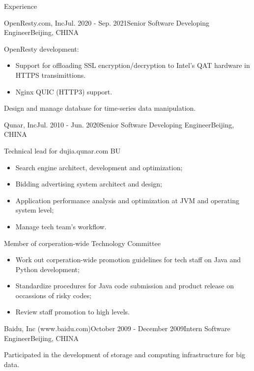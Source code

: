 \documentclass{resume} %
\begin{document}
\begin{rSection}{Experience}

  \begin{rSubsection}{OpenResty.com, Inc}{Jul. 2020 - Sep. 2021}{Senior Software Developing Engineer}{Beijing, CHINA}
  \item OpenResty development:
    \begin {itemize}
    \item Support for offloading SSL encryption/decryption to Intel's QAT hardware in HTTPS transimittions.
    \item Nginx QUIC (HTTP3) support.
    \end{itemize}
  \item Design and manage database for time-series data manipulation.
  \end{rSubsection}
  
  \begin{rSubsection}{Qunar, Inc}{Jul. 2010 - Jun. 2020}{Senior Software Developing Engineer}{Beijing, CHINA}
  \item Technical lead for dujia.qunar.com BU
    \begin{itemize}
    \item Search engine architect, development and optimization;
    \item Bidding advertising system architect and design;
    \item Application performance analysis and optimization at JVM and operating system level;
    \item Manage tech team's workflow.
    \end{itemize}
  \item Member of corperation-wide Technology Committee
    \begin{itemize}
    \item Work out corperation-wide promotion guidelines for tech staff on Java and Python development;
    \item Standardize procedures for Java code submission and product release on occassions of risky codes;
    \item Review staff promotion to high levels.
    \end{itemize}
  
  \end{rSubsection}


  \begin{rSubsection}{Baidu, Inc (www.baidu.com)}{October 2009 - December 2009}{Intern Software Engineer}{Beijing, CHINA}
  \item Participated in the development of storage and computing infrastructure for big data.
  \end{rSubsection}

\end{rSection}
\end{document}
